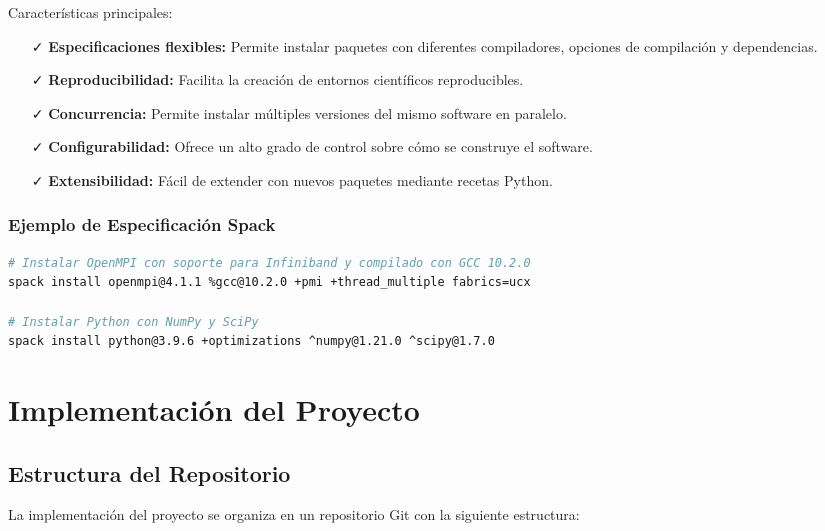 \documentclass[12pt,a4paper]{report}
\begin{document}
Características principales:
\begin{itemize}
    \item[\textcolor{cientigo-green}{\faCheck}] \textbf{Especificaciones flexibles:} Permite instalar paquetes con diferentes compiladores, opciones de compilación y dependencias.
    \item[\textcolor{cientigo-green}{\faCheck}] \textbf{Reproducibilidad:} Facilita la creación de entornos científicos reproducibles.
    \item[\textcolor{cientigo-green}{\faCheck}] \textbf{Concurrencia:} Permite instalar múltiples versiones del mismo software en paralelo.
    \item[\textcolor{cientigo-green}{\faCheck}] \textbf{Configurabilidad:} Ofrece un alto grado de control sobre cómo se construye el software.
    \item[\textcolor{cientigo-green}{\faCheck}] \textbf{Extensibilidad:} Fácil de extender con nuevos paquetes mediante recetas Python.
\end{itemize}

\subsection{Ejemplo de Especificación Spack}

\begin{lstlisting}[language=bash]
# Instalar OpenMPI con soporte para Infiniband y compilado con GCC 10.2.0
spack install openmpi@4.1.1 %gcc@10.2.0 +pmi +thread_multiple fabrics=ucx

# Instalar Python con NumPy y SciPy
spack install python@3.9.6 +optimizations ^numpy@1.21.0 ^scipy@1.7.0
\end{lstlisting}

\chapter{Implementación del Proyecto}

\section{Estructura del Repositorio}

La implementación del proyecto se organiza en un repositorio Git con la siguiente estructura:
\end{document}
